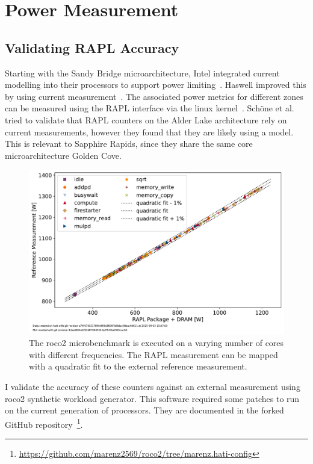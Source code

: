 \chapter{Power Measurement}
\label{sec:power_measurement}

\section{Validating RAPL Accuracy}
Starting with the Sandy Bridge microarchitecture, Intel integrated current modelling into their processors to support power limiting~\cite{Hackenberg_2013_RAPL_APM}.
Haswell improved this by using current measurement~\cite{Hackenberg_2015_Haswell}.
The associated power metrics for different zones can be measured using the RAPL interface via the linux kernel~\cite{powercap_kernel_doc}.
Schöne et al.~\cite{Schoene_2024_Alder_Lake} tried to validate that RAPL counters on the Alder Lake architecture rely on current measurements, however they found that they are likely using a model.
This is relevant to Sapphire Rapids, since they share the same core microarchitecture Golden Cove.

\begin{figure}[]
    \centering
    \includegraphics[width=0.8\columnwidth]{fig/rapl-accuracy/rapl-accuracy.pdf}
    \caption{\label{fig:validate-rapl}The roco2 microbenchmark is executed on a varying number of cores with different frequencies.
    The RAPL measurement can be mapped with a quadratic fit to the external reference measurement.}
\end{figure}

I validate the accuracy of these counters against an external measurement using roco2 synthetic workload generator.
This software required some patches to run on the current generation of processors.
They are documented in the forked GitHub repository~\footnote{\url{https://github.com/marenz2569/roco2/tree/marenz.hati-config}}.

